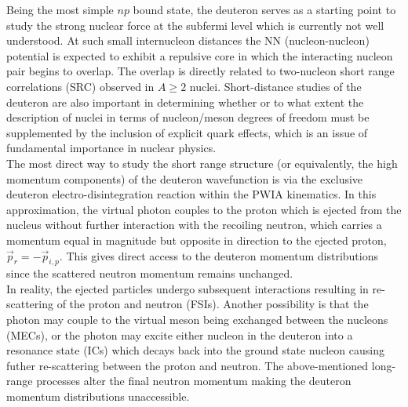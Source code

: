 \documentclass[aps,prl,twocolumn,showpacs,superscriptaddress,groupedaddress]{revtex4-1}  %
\begin{document}
\pacs{}
\maketitle



Being the most simple $np$ bound state, the deuteron serves as a starting point to study the
strong nuclear force at the subfermi level which is currently
not well understood. At such small internucleon distances 
the NN (nucleon-nucleon) potential is expected to exhibit a repulsive core in which 
the interacting nucleon pair begins to overlap. The overlap is 
directly related to two-nucleon short range correlations (SRC) observed in $A\geq2$
nuclei. Short-distance studies of the deuteron are
also important in determining whether or to what extent the
description of nuclei in terms of nucleon/meson degrees of 
freedom must be supplemented by the inclusion of explicit
quark effects, which is an issue of fundamental importance in
nuclear physics\cite{pr01-020}. \\
\indent The most direct way to study the short range structure (or equivalently, the high momentum components)
of the deuteron wavefunction is via the exclusive deuteron electro-disintegration reaction within the
PWIA kinematics. In this approximation, the virtual photon couples to the proton which is ejected from the nucleus without
further interaction with the recoiling neutron, which carries a momentum equal in magnitude but opposite in direction to the ejected proton, $\vec{p}_{r} = -\vec{p}_{i,p}$.
This gives direct access to the deuteron momentum distributions since the scattered neutron momentum remains unchanged. \\
\indent In reality, the ejected particles undergo subsequent interactions resulting in re-scattering of the proton and neutron (FSIs).
Another possibility is that the photon may couple to the virtual meson being exchanged between the nucleons (MECs), or the photon may excite either nucleon in the deuteron
into a resonance state (ICs) which decays back into the ground state nucleon causing futher re-scattering between the proton and neutron. The above-mentioned long-range processes
alter the final neutron momentum making the deuteron momentum distributions unaccessible.\\
\end{document}
